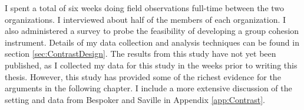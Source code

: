 I spent a total of six weeks doing field observations full-time between the two organizations. I interviewed about half of the members of each organization. I also administered a survey to probe the feasibility of developing a group cohesion instrument. Details of my data collection and analysis techniques can be found in section \ref{sec:ContrastDesign}. The results from this study have not yet been published, as I collected my data for this study in the weeks prior to writing this thesis. However, this study has provided some of the richest evidence for the arguments in the following chapter. I include a more extensive discussion of the setting and data from Bespoker and Saville in Appendix \ref{app:Contrast}.
